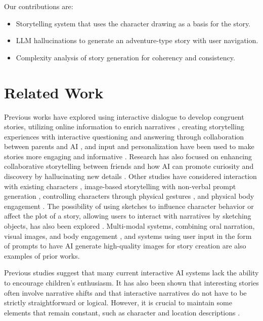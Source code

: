 \documentclass[submit,techrep,english]{ipsj}
\begin{document}
Our contributions are:
\begin{itemize}
    \item Storytelling system that uses the character drawing as a basis for the story.
    \item LLM hallucinations to generate an adventure-type story with user navigation.
    \item Complexity analysis of story generation for coherency and consistency.
\end{itemize}


\section{Related Work}
\label{sec:related-work}

Previous works have explored using interactive dialogue to develop congruent stories, utilizing online information to enrich narratives \cite{13:abs-2011-04242}, creating storytelling experiences with interactive questioning and answering through collaboration between parents and AI \cite{12:ZhangXWYRWYWL22}, and input and personalization have been used to make stories more engaging and informative \cite{14:WangRCRMB22}. Research has also focused on enhancing collaborative storytelling between friends and how AI can promote curiosity and discovery by hallucinating new details \cite{8:ShakeriND21}. Other studies have considered interaction with existing characters \cite{10:ChopraVSS21}, image-based storytelling with non-verbal prompt generation \cite{4:HanC23}, controlling characters through physical gestures \cite{2:LiuLWCS12}, and physical body engagement \cite{3:ZhaoB23}. The possibility of using sketches to influence character behavior or affect the plot of a story, allowing users to interact with narratives by sketching objects, has also been explored \cite{11:LimaGV20}. Multi-modal systems, combining oral narration, visual images, and body engagement \cite{3:ZhaoB23}, and systems using user input in the form of prompts to have AI generate high-quality images for story creation \cite{4:HanC23} are also examples of prior works.

Previous studies suggest that many current interactive AI systems lack the ability to encourage children's enthusiasm. It has also been shown that interesting stories often involve narrative shifts and that interactive narratives do not have to be strictly straightforward or logical. However, it is crucial to maintain some elements that remain constant, such as character and location descriptions \cite{13:abs-2011-04242}.
\end{document}
